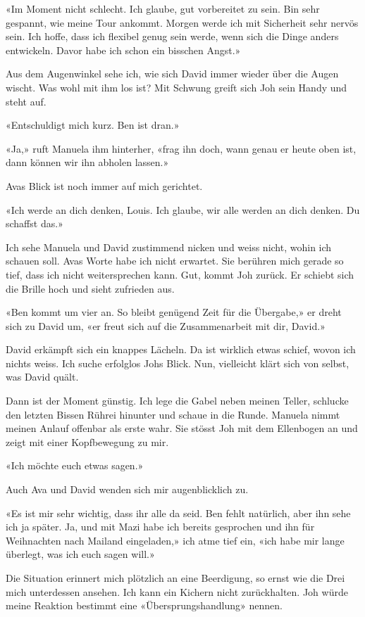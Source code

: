 «Im Moment nicht schlecht. Ich glaube, gut vorbereitet zu sein. Bin sehr
gespannt, wie meine Tour ankommt. Morgen werde ich mit Sicherheit sehr
nervös sein. Ich hoffe, dass ich flexibel genug sein werde, wenn sich
die Dinge anders entwickeln. Davor habe ich schon ein bisschen Angst.»

Aus dem Augenwinkel sehe ich, wie sich David immer wieder über die Augen
wischt. Was wohl mit ihm los ist? Mit Schwung greift sich Joh sein Handy und steht auf.

«Entschuldigt mich kurz. Ben ist dran.»

«Ja,» ruft Manuela ihm hinterher, «frag ihn doch, wann genau er heute
oben ist, dann können wir ihn abholen lassen.»

Avas Blick ist noch immer auf mich gerichtet.

«Ich werde an dich denken, Louis. Ich glaube, wir alle werden an dich
denken. Du schaffst das.»

Ich sehe Manuela und David zustimmend nicken und weiss nicht, wohin ich
schauen soll. Avas Worte habe ich nicht erwartet. Sie berühren mich
gerade so tief, dass ich nicht weitersprechen kann.
Gut, kommt Joh zurück. Er schiebt sich die Brille hoch und sieht
zufrieden aus.

«Ben kommt um vier an. So bleibt genügend Zeit für die Übergabe,» er
dreht sich zu David um, «er freut sich auf die Zusammenarbeit mit dir,
David.»

David erkämpft sich ein knappes Lächeln. Da ist wirklich etwas schief,
wovon ich nichts weiss.
Ich suche erfolglos Johs Blick. Nun, vielleicht klärt sich von selbst,
was David quält.

Dann ist der Moment günstig. Ich lege die Gabel neben meinen Teller,
schlucke den letzten Bissen Rührei hinunter und schaue in die Runde.
Manuela nimmt meinen Anlauf offenbar als erste wahr. Sie stösst Joh mit
dem Ellenbogen an und zeigt mit einer Kopfbewegung zu mir.

«Ich möchte euch etwas sagen.»

Auch Ava und David wenden sich mir augenblicklich zu.

«Es ist mir sehr wichtig, dass ihr alle da seid. Ben fehlt natürlich,
aber ihn sehe ich ja später. Ja, und mit Mazi habe ich bereits
gesprochen und ihn für Weihnachten nach Mailand eingeladen,» ich atme
tief ein, «ich habe mir lange überlegt, was ich euch sagen will.»

Die Situation erinnert mich plötzlich an eine Beerdigung, so ernst wie
die Drei mich unterdessen ansehen. Ich kann ein Kichern nicht
zurückhalten. Joh würde meine Reaktion bestimmt eine
«Übersprungshandlung» nennen.

